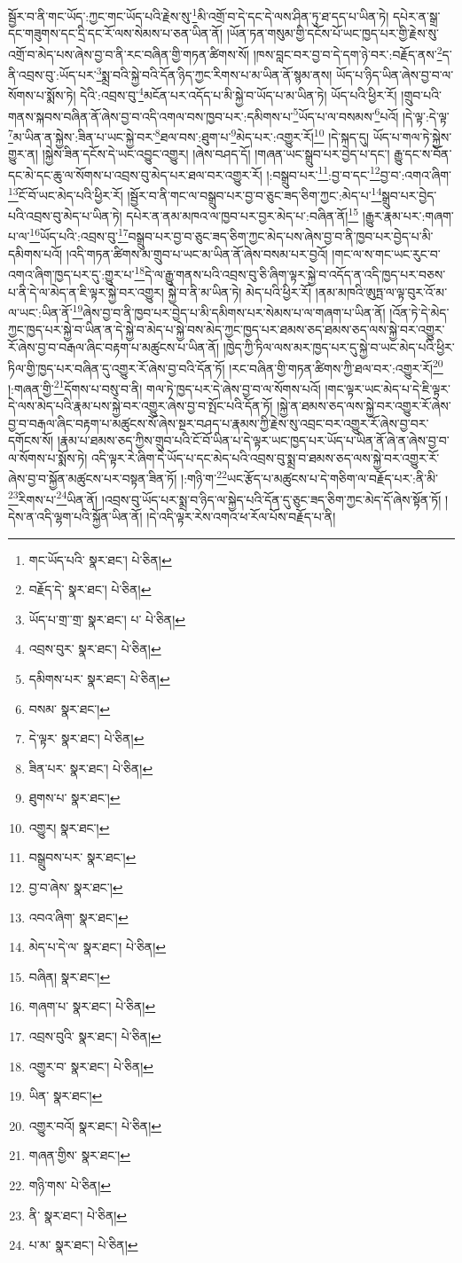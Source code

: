 སྦྱོར་བ་ནི་གང་ཡོད་:ཀྱང་གང་ཡོད་པའི་རྗེས་སུ་\footnote{གང་ཡོད་པའི་  སྣར་ཐང་།  པེ་ཅིན། }མི་འགྲོ་བ་དེ་དང་དེ་ལས་ཤིན་ཏུ་ཐ་དད་པ་ཡིན་ཏེ། དཔེར་ན་སྒྲ་དང་གཟུགས་དང་དྲི་དང་རོ་ལས་སེམས་པ་ཅན་ཡིན་ནོ། །ཡོན་ཏན་གསུམ་གྱི་དངོས་པོ་ཡང་ཁྱད་པར་གྱི་རྗེས་སུ་འགྲོ་བ་མེད་པས་ཞེས་བྱ་བ་ནི་རང་བཞིན་གྱི་གཏན་ཚིགས་སོ། །ཁས་བླང་བར་བྱ་བ་དེ་དག་ཉེ་བར་:བརྗོད་ནས་\footnote{བརྗོད་དེ་  སྣར་ཐང་།  པེ་ཅིན། }ད་ནི་འབྲས་བུ་:ཡོད་པར་\footnote{ཡོད་པ་གྲ་་གྲ་  སྣར་ཐང་། པ་  པེ་ཅིན། }སྨྲ་བའི་སྐྱེ་བའི་དོན་ཉིད་ཀྱང་རིགས་པ་མ་ཡིན་ནོ་སྙམ་ནས། ཡོད་པ་ཉིད་ཡིན་ཞེས་བྱ་བ་ལ་སོགས་པ་སྨོས་ཏེ། དེའི་:འབྲས་བུ་\footnote{འབྲས་བུར་  སྣར་ཐང་།  པེ་ཅིན། }མངོན་པར་འདོད་པ་མི་སྐྱེ་བ་ཡོད་པ་མ་ཡིན་ཏེ། ཡོད་པའི་ཕྱིར་རོ། །གྲུབ་པའི་གནས་སྐབས་བཞིན་ནོ་ཞེས་བྱ་བ་འདི་འགལ་བས་ཁྱབ་པར་:དམིགས་པ་\footnote{དམིགས་པར་  སྣར་ཐང་།  པེ་ཅིན། }ཡོད་པ་ལ་བསམས་\footnote{བསམ་  སྣར་ཐང་། }པའོ། །དེ་ལྟ་:དེ་ལྟ་\footnote{དེ་ལྟར་  སྣར་ཐང་།  པེ་ཅིན། }མ་ཡིན་ན་སྐྱེས་:ཟིན་པ་ཡང་སྐྱེ་བར་\footnote{ཟིན་པར་  སྣར་ཐང་།  པེ་ཅིན། }ཐལ་བས་:ཐུག་པ་\footnote{ཐུགས་པ་  སྣར་ཐང་། }མེད་པར་:འགྱུར་རོ།\footnote{འགྱུར།  སྣར་ཐང་། } །དེ་སྐད་དུ། ཡོད་པ་གལ་ཏེ་སྐྱེས་གྱུར་ན། །སྐྱེས་ཟིན་དངོས་དེ་ཡང་འབྱུང་འགྱུར། །ཞེས་བཤད་དོ། །གཞན་ཡང་སྒྲུབ་པར་བྱེད་པ་དང་། རྒྱུ་དང་ས་བོན་དང་མེ་དང་ཆུ་ལ་སོགས་པ་འབྲས་བུ་མེད་པར་ཐལ་བར་འགྱུར་རོ། །:བསྒྲུབ་པར་\footnote{བསྒྲུབས་པར་  སྣར་ཐང་། }:བྱ་བ་དང་\footnote{བྱ་བ་ཞེས་  སྣར་ཐང་། }བྱ་བ་:འགའ་ཞིག་\footnote{འབའ་ཞིག་  སྣར་ཐང་། }ངོ་བོ་ཡང་མེད་པའི་ཕྱིར་རོ། །སྦྱོར་བ་ནི་གང་ལ་བསྒྲུབ་པར་བྱ་བ་ཅུང་ཟད་ཅིག་ཀྱང་:མེད་པ་\footnote{མེད་པ་དེ་ལ་  སྣར་ཐང་།  པེ་ཅིན། }སྒྲུབ་པར་བྱེད་པའི་འབྲས་བུ་མེད་པ་ཡིན་ཏེ། དཔེར་ན་ནམ་མཁའ་ལ་ཁྱབ་པར་བྱར་མེད་པ་:བཞིན་ནོ།\footnote{བཞིན།  སྣར་ཐང་། } །རྒྱུར་རྣམ་པར་:གཞག་པ་ལ་\footnote{གཞག་པ་  སྣར་ཐང་།  པེ་ཅིན། }ཡོད་པའི་:འབྲས་བུ་\footnote{འབྲས་བུའི་  སྣར་ཐང་།  པེ་ཅིན། }བསྒྲུབ་པར་བྱ་བ་ཅུང་ཟད་ཅིག་ཀྱང་མེད་པས་ཞེས་བྱ་བ་ནི་ཁྱབ་པར་བྱེད་པ་མི་དམིགས་པའོ། །འདི་གཏན་ཚིགས་མ་གྲུབ་པ་ཡང་མ་ཡིན་ནོ་ཞེས་བསམ་པར་བྱའོ། །གང་ལ་ས་གང་ཡང་རུང་བ་འགའ་ཞིག་ཁྱད་པར་དུ་:གྱུར་པ་\footnote{འགྱུར་བ་  སྣར་ཐང་།  པེ་ཅིན། }དེ་ལ་རྒྱུ་གནས་པའི་འབྲས་བུ་ཅི་ཞིག་ལྟར་སྐྱེ་བ་འདོད་ན་འདི་ཁྱད་པར་བཅས་པ་ནི་དེ་ལ་མེད་ན་ཇི་ལྟར་སྐྱེ་བར་འགྱུར། སྐྱེ་བ་ནི་མ་ཡིན་ཏེ། མེད་པའི་ཕྱིར་རོ། །ནམ་མཁའི་ཨུཏྤ་ལ་ལྟ་བུར་འོ་མ་ལ་ཡང་:ཡིན་ནོ་\footnote{ཡིན་  སྣར་ཐང་། }ཞེས་བྱ་བ་ནི་ཁྱབ་པར་བྱེད་པ་མི་དམིགས་པར་སེམས་པ་ལ་གཞག་པ་ཡིན་ནོ། །འོན་ཏེ་དེ་མེད་ཀྱང་ཁྱད་པར་སྐྱེ་བ་ཡིན་ན་དེ་སྐྱེ་བ་མེད་པ་སྐྱེ་བས་མེད་ཀྱང་ཁྱད་པར་ཐམས་ཅད་ཐམས་ཅད་ལས་སྐྱེ་བར་འགྱུར་རོ་ཞེས་བྱ་བ་བརྒལ་ཞིང་བརྟག་པ་མཚུངས་པ་ཡིན་ནོ། །ཁྱེད་ཀྱི་ཏིལ་ལས་མར་ཁྱད་པར་དུ་སྐྱེ་བ་ཡང་མེད་པའི་ཕྱིར་ཏིལ་གྱི་ཁྱད་པར་བཞིན་དུ་འགྱུར་རོ་ཞེས་བྱ་བའི་དོན་ཏོ། །རང་བཞིན་གྱི་གཏན་ཚིགས་ཀྱི་ཐལ་བར་:འགྱུར་རོ།\footnote{འགྱུར་བའོ།  སྣར་ཐང་།  པེ་ཅིན། } །:གཞན་གྱི་\footnote{གཞན་གྱིས་  སྣར་ཐང་། }དོགས་པ་བསུ་བ་ནི། གལ་ཏེ་ཁྱད་པར་དེ་ཞེས་བྱ་བ་ལ་སོགས་པའོ། །གང་ལྟར་ཡང་མེད་པ་དེ་ཇི་ལྟར་དེ་ལས་མེད་པའི་རྣམ་པས་སྐྱེ་བར་འགྱུར་ཞེས་བྱ་བ་སྤོང་པའི་དོན་ཏོ། །སྐྱེ་ན་ཐམས་ཅད་ལས་སྐྱེ་བར་འགྱུར་རོ་ཞེས་བྱ་བ་བརྒལ་ཞིང་བརྟག་པ་མཚུངས་སོ་ཞེས་སྔར་བཤད་པ་རྣམས་ཀྱི་རྗེས་སུ་འབྲང་བར་འགྱུར་རོ་ཞེས་བྱ་བར་དགོངས་སོ། །རྣམ་པ་ཐམས་ཅད་ཀྱིས་གྲུབ་པའི་ངོ་བོ་ཡིན་པ་དེ་ལྟར་ཡང་ཁྱད་པར་ཡོད་པ་ཡིན་ནོ་ཞེ་ན་ཞེས་བྱ་བ་ལ་སོགས་པ་སྨོས་ཏེ། འདི་ལྟར་རེ་ཞིག་དེ་ཡོད་པ་དང་མེད་པའི་འབྲས་བུ་སྨྲ་བ་ཐམས་ཅད་ལས་སྐྱེ་བར་འགྱུར་རོ་ཞེས་བྱ་བ་སྐྱོན་མཚུངས་པར་བསྟན་ཟིན་ཏོ། །:གཉི་ག་\footnote{གཉི་གས་  པེ་ཅིན། }ཡང་རྩོད་པ་མཚུངས་པ་དེ་གཅིག་ལ་བརྗོད་པར་:ནི་མི་\footnote{ནི་  སྣར་ཐང་།  པེ་ཅིན། }རིགས་པ་\footnote{པ་མ་  སྣར་ཐང་།  པེ་ཅིན། }ཡིན་ནོ། །འབྲས་བུ་ཡོད་པར་སྨྲ་བ་ཉིད་ལ་སྐྱེད་པའི་དོན་དུ་ཅུང་ཟད་ཅིག་ཀྱང་མེད་དོ་ཞེས་སྟོན་ཏོ། །དེས་ན་འདི་ལྷག་པའི་སྐྱོན་ཡིན་ནོ། །དེ་འདི་ལྟར་རེས་འགའ་ཕ་རོལ་པོས་བརྗོད་པ་ནི། 